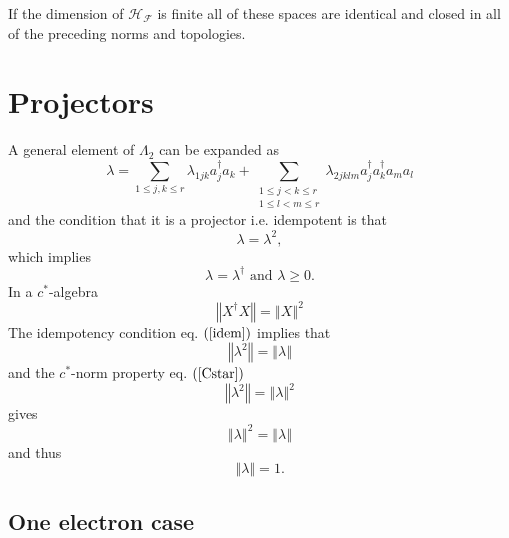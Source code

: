 \documentclass[aps,preprint,amsfonts,amssymb,showpacs,showkeys]{revtex4}%
\begin{document}
If the dimension of $\mathcal{H}_{\mathcal{F}}$ is finite all of these spaces
are identical and closed in all of the preceding norms and topologies.

\section{Projectors \label{Projection}}

A general element of $\Lambda_{2}$ can be expanded as
\begin{equation}
\lambda=\sum_{1\leq j,k\leq r}\lambda_{1jk}a_{j}^{\dagger}a_{k}+\sum
_{\substack{1\leq j<k\leq r\\1\leq l<m\leq r}}\lambda_{2jklm}a_{j}^{\dagger
}a_{k}^{\dagger}a_{m}a_{l}%
\end{equation}
and the condition that it is a projector i.e. idempotent is that%
\begin{equation}
\lambda=\lambda^{2}, \label{idem}%
\end{equation}
which implies
\begin{equation}
\lambda=\lambda^{\dagger}\text{ and }\lambda\geq0.
\end{equation}
In a $c^{\ast}$-algebra
\begin{equation}
\left\Vert X^{\dagger}X\right\Vert =\left\Vert X\right\Vert ^{2} \label{Cstar}%
\end{equation}
The idempotency condition eq. $\left(  \ref{idem}\right)  $ implies that
\begin{equation}
\left\Vert \lambda^{2}\right\Vert =\left\Vert \lambda\right\Vert
\end{equation}
and the $c^{\ast}$-norm property eq. $\left(  \ref{Cstar}\right)  $%
\begin{equation}
\left\Vert \lambda^{2}\right\Vert =\left\Vert \lambda\right\Vert ^{2}%
\end{equation}
gives
\begin{equation}
\left\Vert \lambda\right\Vert ^{2}=\left\Vert \lambda\right\Vert
\end{equation}
and thus
\begin{equation}
\left\Vert \lambda\right\Vert =1.
\end{equation}


\subsection{One electron case}
\end{document}
